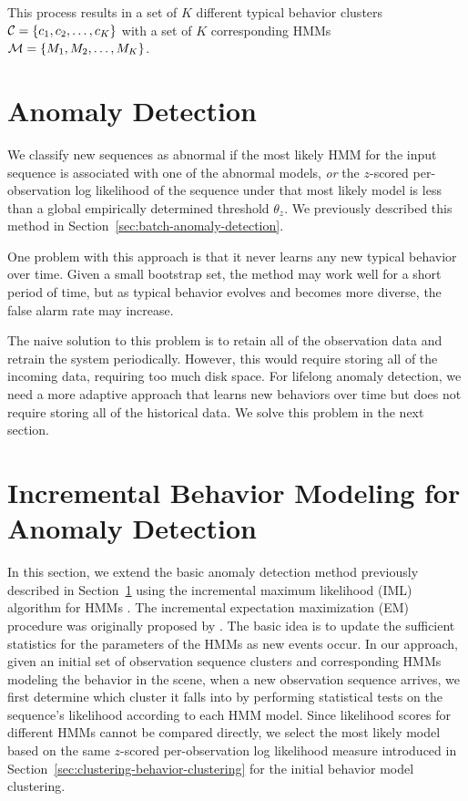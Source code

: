 This process results in a set of $K$ different typical behavior
clusters ${\cal C} = \{ c_1, c_2, \ldots, c_K \}$ with a set of $K$
corresponding HMMs ${\cal M} = \{ M_1, M_2, \ldots, M_K \}$.

\section{Anomaly Detection}
\label{incremental-detection}

We classify new sequences as abnormal if the most likely HMM for the
input sequence is associated with one of the abnormal
models, \textit{or} the $z$-scored per-observation log likelihood of
the sequence under that most likely model is less than a global
empirically determined threshold $\theta_z$. We previously described
this method in Section~\ref{sec:batch-anomaly-detection}.

One problem with this approach is that it never learns any new typical
behavior over time.  Given a small bootstrap set, the method may work
well for a short period of time, but as typical behavior evolves and
becomes more diverse, the false alarm rate may increase.

The naive solution to this problem is to retain all of the observation
data and retrain the system periodically.  However, this would require
storing all of the incoming data, requiring too much disk space. For
lifelong anomaly detection, we need a more adaptive approach that
learns new behaviors over time but does not require storing all of the
historical data. We solve this problem in the next section.

\section{Incremental Behavior Modeling for Anomaly Detection}
\label{incremental-inc-modeling}

In this section, we extend the basic anomaly detection method
previously described in Section~\ref{incremental-detection} using the
incremental maximum likelihood (IML) algorithm for HMMs
. The incremental expectation maximization (EM)
procedure was originally proposed by . The basic
idea is to update the sufficient statistics for the parameters of the
HMMs as new events occur. In our approach, given an initial set of
observation sequence clusters and corresponding HMMs modeling the
behavior in the scene, when a new observation sequence arrives, we
first determine which cluster it falls into by performing statistical
tests on the sequence's likelihood according to each HMM model. Since
likelihood scores for different HMMs cannot be compared directly, we
select the most likely model based on the same $z$-scored
per-observation log likelihood measure introduced in
Section~\ref{sec:clustering-behavior-clustering} for the initial
behavior model clustering.

